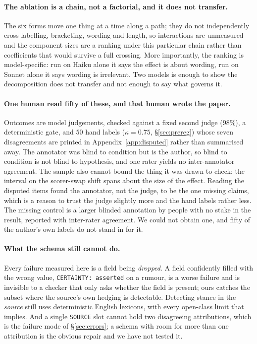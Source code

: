 \documentclass[11pt]{article}
\begin{document}
\paragraph{The ablation is a chain, not a factorial, and it does not transfer.} The six
forms move one thing at a time along a path; they do not independently cross labelling,
bracketing, wording and length, so interactions are unmeasured and the component sizes are
a ranking under this particular chain rather than coefficients that would survive a full
crossing. More importantly, the ranking is model-specific: run on Haiku alone it says the
effect is about wording, run on Sonnet alone it says wording is irrelevant. Two models is
enough to show the decomposition does not transfer and not enough to say what governs it.

\paragraph{One human read fifty of these, and that human wrote the paper.} Outcomes are
model judgements, checked against a fixed second judge ($98\%$), a deterministic gate, and
$50$ hand labels ($\kappa=0.75$, \S\ref{sec:prereg}) whose seven disagreements are printed
in Appendix~\ref{app:disputed} rather than summarised away. The annotator was blind to condition but is the author, so blind
to condition is not blind to hypothesis, and one rater yields no inter-annotator
agreement. The sample also cannot bound the thing it was drawn to check: the interval on
the scorer-swap shift spans about the size of the effect. Reading the disputed items found
the annotator, not the judge, to be the one missing claims, which is a reason to trust the
judge slightly more and the hand labels rather less. The missing control is a larger
blinded annotation by people with no stake in the result, reported with inter-rater
agreement. We could not obtain one, and fifty of the author's own labels do not stand in
for it.

\paragraph{What the schema still cannot do.} Every failure measured here is a field being
\emph{dropped}. A field confidently filled with the wrong value, \texttt{CERTAINTY:
asserted} on a rumour, is a worse failure and is invisible to a checker that only asks
whether the field is present; ours catches the subset where the source's own hedging is
detectable. Detecting stance in the \emph{source} still uses deterministic English
lexicons, with every open-class limit that implies. And a single \texttt{SOURCE} slot
cannot hold two disagreeing attributions, which is the failure mode of
\S\ref{sec:errors}; a schema with room for more than one attribution is the obvious
repair and we have not tested it.
\end{document}
